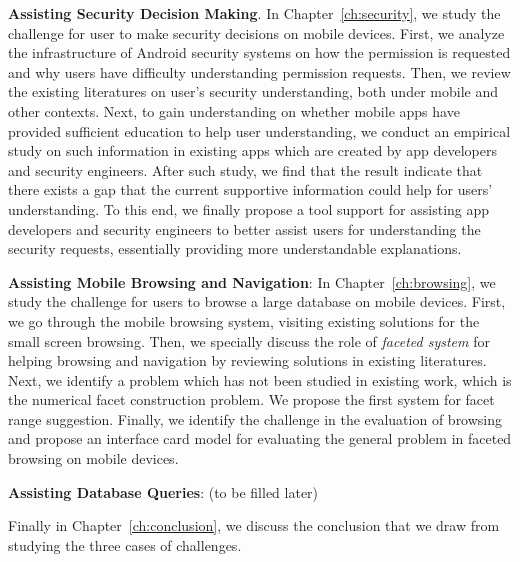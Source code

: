 \textbf{Assisting Security Decision Making}. In Chapter~\ref{ch:security}, we study the challenge for user to make security decisions on mobile devices. First, we analyze the infrastructure of Android security systems on how the permission is requested and why users have difficulty understanding permission requests. Then, we review the existing literatures on user's security understanding, both under mobile and other contexts. Next, to gain understanding on whether mobile apps have provided sufficient education to help user understanding, we conduct an empirical study on such information in existing apps which are created by app developers and security engineers. After such study, we find that the result indicate that there exists a gap that the current supportive information could help for users' understanding. To this end, we finally propose a tool support for assisting app developers and security engineers to better assist users for understanding the security requests, essentially providing more understandable explanations. 

\textbf{Assisting Mobile Browsing and Navigation}: In Chapter~\ref{ch:browsing}, we study the challenge for users to browse a large database on mobile devices. First, we go through the mobile browsing system, visiting existing solutions for the small screen browsing. Then, we specially discuss the role of \textit{faceted system} for helping browsing and navigation by reviewing solutions in existing literatures. Next, we identify a problem which has not been studied in existing work, which is the numerical facet construction problem. We propose the first system for facet range suggestion. Finally, we identify the challenge in the evaluation of browsing and propose an interface card model for evaluating the general problem in faceted browsing on mobile devices. 

\textbf{Assisting Database Queries}: (to be filled later)

Finally in Chapter~\ref{ch:conclusion}, we discuss the conclusion that we draw from studying the three cases of challenges. 